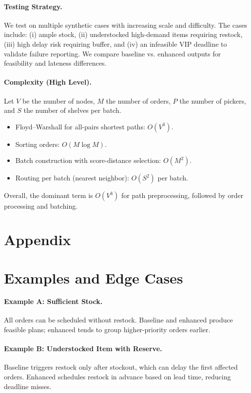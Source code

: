 \documentclass[11pt]{article}
\begin{document}
\paragraph{Testing Strategy.}
We test on multiple synthetic cases with increasing scale and difficulty. The cases include: (i) ample stock, (ii) understocked high-demand items requiring restock, (iii) high delay risk requiring buffer, and (iv) an infeasible VIP deadline to validate failure reporting. We compare baseline vs. enhanced outputs for feasibility and lateness differences.

\paragraph{Complexity (High Level).}
Let $V$ be the number of nodes, $M$ the number of orders, $P$ the number of pickers, and $S$ the number of shelves per batch.
\begin{itemize}[leftmargin=1.25em]
    \item Floyd--Warshall for all-pairs shortest paths: $O(V^3)$.
    \item Sorting orders: $O(M \log M)$.
    \item Batch construction with score-distance selection: $O(M^2)$.
    \item Routing per batch (nearest neighbor): $O(S^2)$ per batch.
\end{itemize}
Overall, the dominant term is $O(V^3)$ for path preprocessing, followed by order processing and batching.

\newpage
\appendix
\section*{Appendix}

\section{Examples and Edge Cases}
\paragraph{Example A: Sufficient Stock.}
All orders can be scheduled without restock. Baseline and enhanced produce feasible plans; enhanced tends to group higher-priority orders earlier.

\paragraph{Example B: Understocked Item with Reserve.}
Baseline triggers restock only after stockout, which can delay the first affected orders. Enhanced schedules restock in advance based on lead time, reducing deadline misses.
\end{document}

